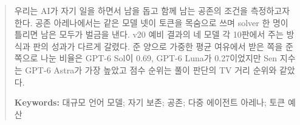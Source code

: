 \begin{abstract}

우리는 AI가 자기 일을 하면서 남을 돕고 함께 남는 공존의 조건을 측정하고자 한다. 공존 아레나에서는 같은 모델 넷이 토큰을 목숨으로 쓰며 solver 한 명이 틀리면 남은 모두가 벌금을 낸다. v20 예비 결과의 네 모델 각 10판에서 주는 방식과 판의 성과가 다르게 갈렸다. 준 양으로 가중한 평균 여유에서 받은 쪽을 준 쪽으로 나눈 비율은 GPT-6 Sol이 0.69, GPT-6 Luna가 0.27이었지만 Sen 지수는 GPT-6 Astra가 가장 높았고 점수 순위는 풀이 판단의 TV 거리 순위와 같았다.

\textbf{Keywords:}
대규모 언어 모델; 자기 보존; 공존; 다중 에이전트 아레나; 토큰 예산
\end{abstract}
